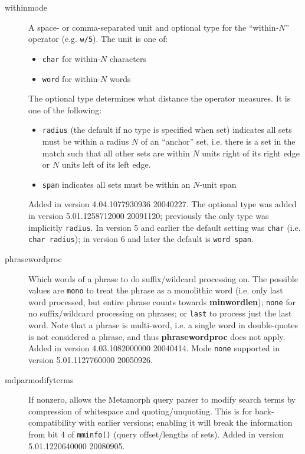 \begin{description}
\item[withinmode]
    A space- or comma-separated unit and optional type for the
    ``within-$N$'' operator (e.g. \verb`w/5`).  The unit is one of:
    \begin{itemize}
      \item \verb`char` for within-$N$ characters
      \item \verb`word` for within-$N$ words
    \end{itemize}
    The optional type determines what distance the operator measures.
    It is one of the following:
    \begin{itemize}
      \item \verb`radius` (the default if no type is specified when
        set) indicates all sets must be within a radius $N$ of an
        ``anchor'' set, i.e. there is a set in the match such that all
        other sets are within $N$ units right of its right edge or $N$
        units left of its left edge.
      \item \verb`span` indicates all sets must be within an $N$-unit
        span
    \end{itemize}
    Added in version 4.04.1077930936 20040227.  The optional type was
    added in version 5.01.1258712000 20091120; previously the only
    type was implicitly \verb`radius`.  In version 5 and earlier the
    default setting was \verb`char` (i.e. {\tt char radius}); in
    version 6 and later the default is {\tt word span}.

\item[phrasewordproc]
    Which words of a phrase to do suffix/wildcard processing on.  The
    possible values are \verb`mono` to treat the phrase as a
    monolithic word (i.e. only last word processed, but entire phrase
    counts towards {\bf minwordlen}); \verb`none` for no
    suffix/wildcard processing on phrases; or \verb`last` to process just
    the last word.
%
    Note that a phrase is multi-word, i.e. a single word in double-quotes
    is not considered a phrase, and thus {\bf phrasewordproc} does not apply.
    Added in version 4.03.1082000000 20040414.  Mode \verb`none`
    supported in version 5.01.1127760000 20050926.

\item[mdparmodifyterms]
  If nonzero, allows the Metamorph query parser to modify search terms
by compression of whitespace and quoting/unquoting.  This is for
back-compatibility with earlier versions; enabling it will break the
information from bit 4 of \verb`mminfo()` (query offset/lengths of
sets).  Added in version 5.01.1220640000 20080905.

\end{description}

